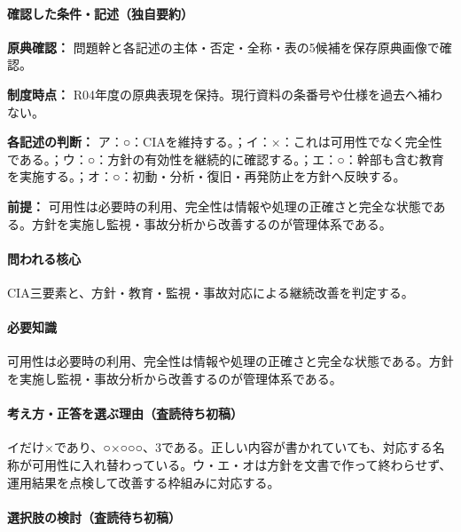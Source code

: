 \paragraph{確認した条件・記述（独自要約）}\mbox{}\par

\noindent\textbf{原典確認：} 問題幹と各記述の主体・否定・全称・表の5候補を保存原典画像で確認。\par

\noindent\textbf{制度時点：} R04年度の原典表現を保持。現行資料の条番号や仕様を過去へ補わない。\par

\noindent\textbf{各記述の判断：} ア：○：CIAを維持する。；イ：×：これは可用性でなく完全性である。；ウ：○：方針の有効性を継続的に確認する。；エ：○：幹部も含む教育を実施する。；オ：○：初動・分析・復旧・再発防止を方針へ反映する。\par

\noindent\textbf{前提：} 可用性は必要時の利用、完全性は情報や処理の正確さと完全な状態である。方針を実施し監視・事故分析から改善するのが管理体系である。\par

\paragraph{問われる核心} CIA三要素と、方針・教育・監視・事故対応による継続改善を判定する。

\paragraph{必要知識} 可用性は必要時の利用、完全性は情報や処理の正確さと完全な状態である。方針を実施し監視・事故分析から改善するのが管理体系である。

\paragraph{考え方・正答を選ぶ理由（査読待ち初稿）} イだけ×であり、○×○○○、3である。正しい内容が書かれていても、対応する名称が可用性に入れ替わっている。ウ・エ・オは方針を文書で作って終わらせず、運用結果を点検して改善する枠組みに対応する。

\paragraph{選択肢の検討（査読待ち初稿）}\mbox{}\par

